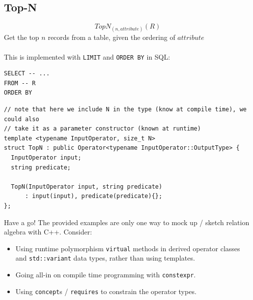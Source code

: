 \subsection{Top-N}
\[TopN_{(n, attribute)}(R)\]
Get the top $n$ records from a table, given the ordering of $attribute$
\\
\\ This is implemented with \texttt{LIMIT} and \texttt{ORDER BY} in SQL:
\begin{verbatim}
SELECT -- ...
FROM -- R
ORDER BY 
\end{verbatim}

\begin{verbatim}
// note that here we include N in the type (know at compile time), we could also
// take it as a parameter constructor (known at runtime)
template <typename InputOperator, size_t N>
struct TopN : public Operator<typename InputOperator::OutputType> {
  InputOperator input;
  string predicate;

  TopN(InputOperator input, string predicate)
      : input(input), predicate(predicate){};
};
\end{verbatim}

\begin{sidenotebox}{Have a go!}
  The provided examples are only one way to mock up / sketch relation algebra with C++. Consider:
  \begin{itemize}
    \item Using runtime polymorphism \texttt{virtual} methods in derived operator classes and \texttt{std::variant} data types, rather than using templates.
    \item Going all-in on compile time programming with \texttt{constexpr}.
    \item Using \texttt{concept}s / \texttt{requires} to constrain the operator types.
  \end{itemize}
\end{sidenotebox}
